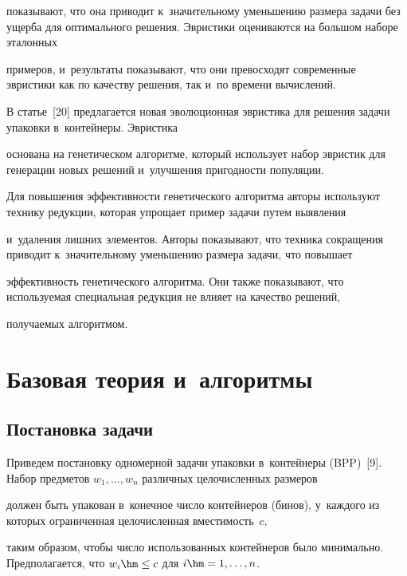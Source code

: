 показывают, что она приводит к~значительному уменьшению размера задачи без ущер\-ба для оптимального решения. Эвристики оцениваются на большом наборе эталонных 

примеров, и~результаты показывают, что они превосходят современные эвристики как по качеству решения, так и~по времени вы\-чис\-ле\-ний.

{



}



В статье~[20] предлагается новая эволюционная эвристика для решения задачи упа\-ков\-ки в~контейнеры. Эвристика 

основана на генетическом алгоритме, который использует набор эвристик для генерации новых решений и~улучшения при\-год\-ности популяции. 

Для повышения эф\-фек\-тив\-ности генетического алгоритма авторы используют технику редукции, которая упрощает пример задачи путем вы\-яв\-ле\-ния 

и~удаления лиш\-них элементов. Авторы показывают, что техника со\-кра\-ще\-ния приводит к~значительному уменьшению размера задачи, что повышает 

эф\-фек\-тив\-ность генетического алгоритма. Они так\-же показывают, что ис\-поль\-зу\-емая специальная редукция не влияет на качество решений, 

по\-лу\-ча\-емых ал\-го\-рит\-мом.







\section{Базовая теория и~алгоритмы}



\subsection{Постановка задачи}



Приведем постановку одномерной задачи упаковки в~контейнеры (BPP)~[9]. Набор предметов $w_1,\ldots,w_n$ различных це\-ло\-чис\-лен\-ных размеров 

дол\-жен быть упакован в~конечное чис\-ло контейнеров (бинов), у~каж\-до\-го из которых ограниченная це\-ло\-чис\-лен\-ная вмес\-ти\-мость~$c$, 

таким образом, чтобы чис\-ло использованных контейнеров было минимально. Предполагается, что $w_i \hm\leq c$ для $i\hm=1,\dots,n$.



